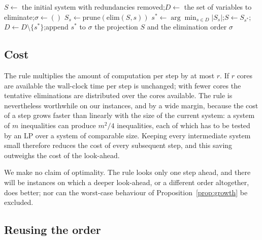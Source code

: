 \documentclass[11pt]{article}
\theoremstyle{definition}
\newcommand{\LPprune}{\mathrm{prune}}
\newcommand{\FMstep}{\mathrm{elim}}
\begin{document}
\begin{algorithm}[t]
\caption{Choice of the elimination order by one-step look-ahead.}
\label{alg:look-ahead}
\begin{algorithmic}[1]
\State $S\gets$ the initial system with redundancies removed;\quad $D\gets$ the set of variables to eliminate;\quad $\sigma\gets()$
     \State $S_s\gets \LPprune(\FMstep(S,s))$
  \EndFor
  \State $s^{*}\gets\arg\min_{s\in D}|S_s|$;\quad $S\gets S_{s^{*}}$;\quad $D\gets D\setminus\{s^{*}\}$;\quad append $s^{*}$ to $\sigma$
\EndWhile
\State \Return the projection $S$ and the elimination order $\sigma$
\end{algorithmic}
\end{algorithm}

\subsection{Cost}
\label{sec:cost}

The rule multiplies the amount of computation per step by at most $r$. If $r$ cores are available the wall-clock time per step is unchanged; with fewer cores the tentative eliminations are distributed over the cores available. The rule is nevertheless worthwhile on our instances, and by a wide margin, because the cost of a step grows faster than linearly with the size of the current system: a system of $m$ inequalities can produce $m^2/4$ inequalities, each of which has to be tested by an LP over a system of comparable size. Keeping every intermediate system small therefore reduces the cost of every subsequent step, and this saving outweighs the cost of the look-ahead.

We make no claim of optimality. The rule looks only one step ahead, and there will be instances on which a deeper look-ahead, or a different order altogether, does better; nor can the worst-case behaviour of Proposition~\ref{prop:growth} be excluded.

\subsection{Reusing the order}
\label{sec:reuse}
\end{document}
